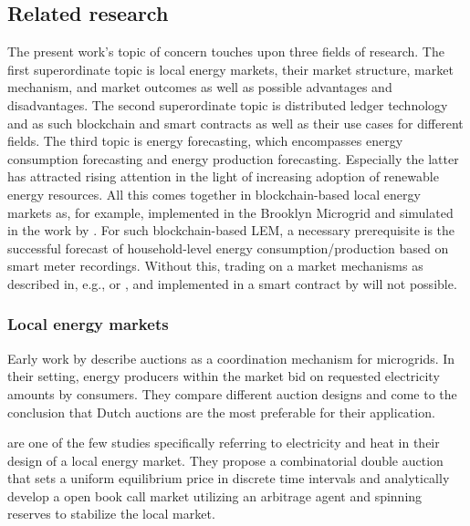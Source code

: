 
\subsection{Related research}\label{Sec:Intro;Subsec:Related}
The present work's topic of concern touches upon three fields of research. The first superordinate topic is local energy markets, their market structure, market mechanism, and market outcomes as well as possible advantages and disadvantages. The second superordinate topic is distributed ledger technology and as such blockchain and smart contracts as well as their use cases for different fields. The third topic is energy forecasting, which encompasses energy consumption forecasting and energy production forecasting. Especially the latter has attracted rising attention in the light of increasing adoption of renewable energy resources. All this comes together in blockchain-based local energy markets as, for example, implemented in the Brooklyn Microgrid and simulated in the work by \citet{Mengelkamp:2018a}. For such blockchain-based LEM, a necessary prerequisite is the successful forecast of household-level energy consumption/production based on smart meter recordings. Without this, trading on a market mechanisms as described in, e.g., \citet{Block:2008} or \citet{Buchmann:2013}, and implemented in a smart contract by \citet{Mengelkamp:2018a} will not possible.


\subsubsection{Local energy markets}

Early work by \citet{Alibhai:2004} describe auctions as a coordination mechanism for microgrids. In their setting, energy producers within the market bid on requested electricity amounts by consumers. They compare different auction designs and come to the conclusion that Dutch auctions are the most preferable for their application.

\citet{Block:2008} are one of the few studies specifically referring to electricity and heat in their design of a local energy market. They propose a combinatorial double auction that sets a uniform equilibrium price in discrete time intervals and analytically develop a open book call market utilizing an arbitrage agent and spinning reserves to stabilize the local market.

